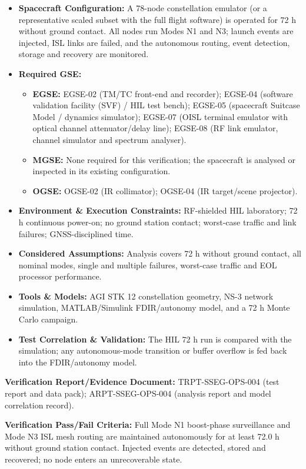 \begin{itemize}
\item \textbf{Spacecraft Configuration:} A 78-node constellation emulator (or a representative scaled subset with the full flight software) is operated for 72 h without ground contact. All nodes run Modes N1 and N3; launch events are injected, ISL links are failed, and the autonomous routing, event detection, storage and recovery are monitored.
\item \textbf{Required GSE:}
\begin{itemize}
\item \textbf{EGSE:} EGSE-02 (TM/TC front-end and recorder); EGSE-04 (software validation facility (SVF) / HIL test bench); EGSE-05 (spacecraft Suitcase Model / dynamics simulator); EGSE-07 (OISL terminal emulator with optical channel attenuator/delay line); EGSE-08 (RF link emulator, channel simulator and spectrum analyser).
\item \textbf{MGSE:} None required for this verification; the spacecraft is analysed or inspected in its existing configuration.
\item \textbf{OGSE:} OGSE-02 (IR collimator); OGSE-04 (IR target/scene projector).
\end{itemize}
\item \textbf{Environment \& Execution Constraints:} RF-shielded HIL laboratory; 72 h continuous power-on; no ground station contact; worst-case traffic and link failures; GNSS-disciplined time.
\item \textbf{Considered Assumptions:} Analysis covers 72 h without ground contact, all nominal modes, single and multiple failures, worst-case traffic and EOL processor performance.
\item \textbf{Tools \& Models:} AGI STK 12 constellation geometry, NS-3 network simulation, MATLAB/Simulink FDIR/autonomy model, and a 72 h Monte Carlo campaign.
\item \textbf{Test Correlation \& Validation:} The HIL 72 h run is compared with the simulation; any autonomous-mode transition or buffer overflow is fed back into the FDIR/autonomy model.
\end{itemize}
\par\textbf{Verification Report/Evidence Document:} TRPT-SSEG-OPS-004 (test report and data pack); ARPT-SSEG-OPS-004 (analysis report and model correlation record).
\par\textbf{Verification Pass/Fail Criteria:} Full Mode N1 boost-phase surveillance and Mode N3 ISL mesh routing are maintained autonomously for at least 72.0 h without ground station contact. Injected events are detected, stored and recovered; no node enters an unrecoverable state.
\par\medskip
